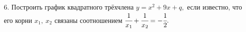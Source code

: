 6. Построить график квадратного трёхчлена $y=x^2+9x+q,$ если известно,
что его корни $x_1,\ x_2$ связаны соотношением $\cfrac{1}{x_1}+\cfrac{1}{x_2}=-\cfrac{1}{2}.$\\
